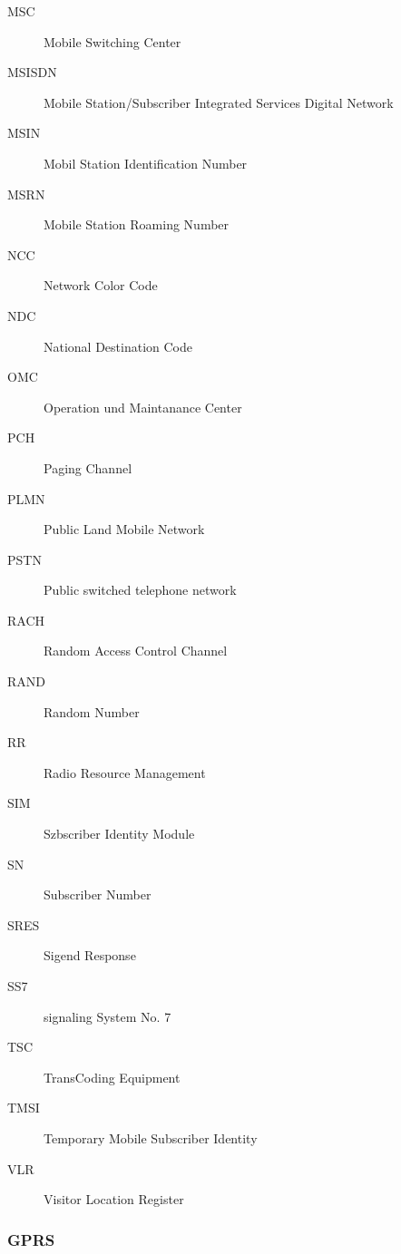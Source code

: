\begin{description}
	\item[MSC] Mobile Switching Center
	\item[MSISDN] Mobile Station/Subscriber Integrated Services Digital Network
	\item[MSIN] Mobil Station Identification Number
	\item[MSRN] Mobile Station Roaming Number
	\item[NCC] Network Color Code
	\item[NDC] National Destination Code
	\item[OMC] Operation und Maintanance Center
	\item[PCH] Paging Channel
	\item[PLMN] Public Land Mobile Network
	\item[PSTN] Public switched telephone network
	\item[RACH] Random Access Control Channel
	\item[RAND] Random Number
	\item[RR] Radio Resource Management
	\item[SIM] Szbscriber Identity Module
	\item[SN] Subscriber Number
	\item[SRES] Sigend Response
	\item[SS7] signaling System No. 7
	\item[TSC] TransCoding Equipment 
	\item[TMSI] Temporary Mobile Subscriber Identity
	\item[VLR] Visitor Location Register
\end{description}

\subsubsection{GPRS}

